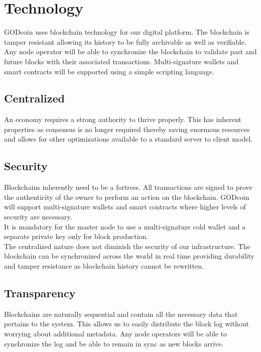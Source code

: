 \documentclass[12pt,a4paper]{article}
\begin{document}
  \section{Technology}
  GODcoin uses blockchain technology for our digital platform. The blockchain is
  tamper resistant allowing its history to be fully archivable as well as
  verifiable. Any node operator will be able to synchronize the blockchain to
  validate past and future blocks with their associated transactions.
  Multi-signature wallets and smart contracts will be supported using a simple
  scripting language.\\

  \subsection{Centralized}
  An economy requires a strong authority to thrive properly. This has
  inherent properties as consensus is no longer required thereby saving enormous
  resources and allows for other optimizations available to a standard server to
  client model.

  \subsection{Security}
  Blockchains inherently need to be a fortress. All transactions are signed to
  prove the authenticity of the owner to perform an action on the blockchain.
  GODcoin will support multi-signature wallets and smart contracts where higher
  levels of security are necessary.\\

  It is mandatory for the master node to use a multi-signature cold wallet and a
  separate private key only for block production.\\

  The centralized nature does not diminish the security of our infrastructure.
  The blockchain can be synchronized across the world in real time providing
  durability and tamper resistance as blockchain history cannot be rewritten.

  \subsection{Transparency}
  Blockchains are naturally sequential and contain all the necessary data that
  pertains to the system. This allows us to easily distribute the block log
  without worrying about additional metadata. Any node operators will be able to
  synchronize the log and be able to remain in sync as new blocks arrive.
\end{document}
